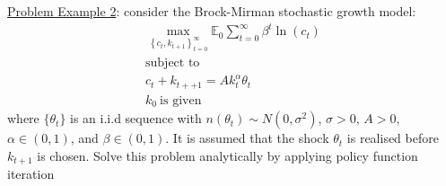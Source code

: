 \documentclass{article}
\begin{document}
\vspace{2.5mm}
\par \underline{Problem Example 2}: consider the Brock-Mirman stochastic growth model:
    \begin{gather*}
        \max_{\left\{ c_{t}, k_{t+1} \right\} ^{\infty}_{t=0}} \mathbb{E}_{0} \sum_{t=0}^{\infty} \beta^{t} \ln(c_{t}) \\
        \text{subject to} \\
        c_{t} + k_{t++1} = Ak_{t}^{\alpha}\theta_{t} \\
        k_{0} \ \text{is given}
    \end{gather*}
where $\{ \theta_{t} \}$ is an i.i.d sequence with $n(\theta_{t}) \sim N(0, \sigma^{2})$, $\sigma > 0$, $A > 0$, $\alpha \in (0,1)$, and $\beta \in (0,1)$. It is assumed that the shock $\theta_{t}$ is realised before $k_{t+1}$ is chosen. Solve this problem analytically by applying policy function iteration
\end{document}
